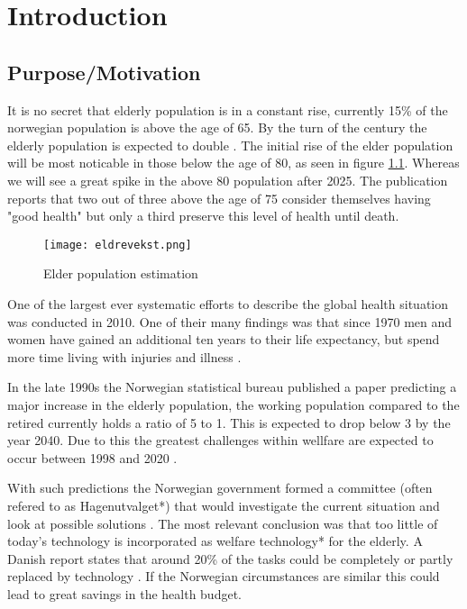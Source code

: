 
\chapter{Introduction} %

\label{Chapter1} %


\section{Purpose/Motivation}
It is no secret that elderly population is in a constant rise, currently 15\% of the norwegian population is above the age of 65. By the turn of the century the elderly population is expected to double \cite{elder}. The initial rise of the elder population will be most noticable in those below the age of 80, as seen in figure \ref{fig:elderPopulation}. Whereas we will see a great spike in the above 80 population after 2025. The publication reports that two out of three above the age of 75 consider themselves having "good health" but only a third preserve this level of health until death.

\begin{figure}[h!]
	\centering
		\label{fig:elderPopulation}
		\texttt{[image: eldrevekst.png]}
		\caption{\footnotesize Elder population estimation \cite{elder}}
\end{figure}

One of the largest ever systematic efforts to describe the global health situation was conducted in 2010. One of their many findings was that since 1970 men and women have gained an additional ten years to their life expectancy, but spend more time living with injuries and illness \cite{globalBurden}. %

In the late 1990s the Norwegian statistical bureau published a paper predicting a major increase in the elderly population, the working population compared to the retired currently holds a ratio of 5 to 1. This is expected to drop below 3 by the year 2040. Due to this the greatest challenges within wellfare are expected to occur between 1998 and 2020 \cite{eldreEksplosjon}. 

With such predictions the Norwegian government formed a committee (often refered to as Hagenutvalget*) that would investigate the current situation and look at possible solutions \cite{haagen}. The most relevant conclusion was that too little of today's technology is incorporated as welfare technology* for the elderly. A Danish report states that around 20\% of the tasks could be completely or partly replaced by technology \cite{kmd}. If the Norwegian circumstances are similar this could lead to great savings in the health budget.

